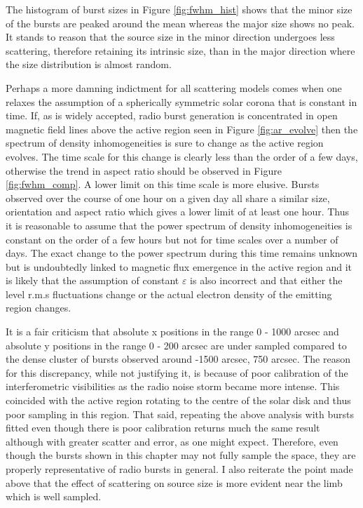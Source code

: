 The histogram of burst sizes in Figure \ref{fig:fwhm_hist} shows that the minor size of the bursts are peaked around the mean whereas the major size shows no peak. It stands to reason that the source size in the minor direction undergoes less scattering, therefore retaining its intrinsic size, than in the major direction where the size distribution is almost random.

Perhaps a more damning indictment for all scattering models comes when one relaxes the assumption of a spherically symmetric solar corona that is constant in time.  If, as is widely accepted, radio burst generation is concentrated in open magnetic field lines above the active region seen in Figure \ref{fig:ar_evolve} then the spectrum of density inhomogeneities is sure to change as the active region evolves. The time scale for this change is clearly less than the order of a few days, otherwise the trend in aspect ratio should be observed in Figure \ref{fig:fwhm_comp}. A lower limit on this time scale is more elusive. Bursts observed over the course of one hour on a given day all share a similar size, orientation and aspect ratio which gives a lower limit of at least one hour. Thus it is reasonable to assume that the power spectrum of density inhomogeneities is constant on the order of a few hours but not for time scales over a number of days. The exact change to the power spectrum during this time remains unknown but is undoubtedly linked to magnetic flux emergence in the active region and it is likely that the assumption of constant $\varepsilon$ is also incorrect and that either the level r.m.s fluctuations change or the actual electron density of the emitting region changes.

It is a fair criticism that absolute x positions in the range 0 - 1000 arcsec and absolute y positions in the range 0 - 200 arcsec are under sampled compared to the dense cluster of bursts observed around -1500 arcsec, 750 arcsec. The reason for this discrepancy, while not justifying it, is because of poor calibration of the interferometric visibilities as the radio noise storm became more intense. This coincided with the active region rotating to the centre of the solar disk and thus poor sampling in this region. That said, repeating the above analysis with bursts fitted even though there is poor calibration returns much the same result although with greater scatter and error, as one might expect. Therefore, even though the bursts shown in this chapter may not fully sample the space, they are properly representative of radio bursts in general. I also reiterate the point made above that the effect of scattering on source size is more evident near the limb which is well sampled. 

